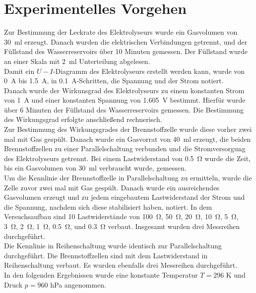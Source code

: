 \documentclass[a4paper,usenatbib]{aspdoc}
\begin{document}
       
    
    \section{Experimentelles Vorgehen}\label{sec:experiment}
        Zur Bestimmung der Leckrate des Elektrolyseurs wurde ein Gasvolumen von \SI{30}{\milli\litre} erzeugt. Danach wurden die elektrischen Verbindungen getrennt, und der Füllstand des Wasserreservoirs über 10 Minuten gemessen. Der Füllstand wurde an einer Skala mit \SI{2}{\milli\litre} Unterteilung abgelesen.\\
        Damit ein $U-I$-Diagramm des Elektrolyseurs erstellt werden kann, wurde von \SI{0}{\ampere} bis \SI{1,5}{\ampere}, in \SI{0,1}{\ampere}-Schritten, die Spannung und der Strom notiert.\\
        Danach wurde der Wirkunsgrad des Elektrolyseurs zu einem konstanten Strom von \SI{1}{\ampere} und einer konstanten Spannung von \SI{1,605}{\volt} bestimmt. Hierfür wurde über 6 Minuten der Füllstand des Wasserreservoirs gemessen. Die Bestimmung des Wirkungsgrad erfolgte anschließend rechnerisch.\\
        Zur Bestimmung des Wirkungsgrades der Brennstoffzelle wurde diese vorher zwei mal mit Gas gespült. Danach wurde ein Gasvorrat von \SI{40}{\milli\litre} erzeugt, die beiden Brennstoffzellen zu einer Parallelschaltung verbunden und die Stromversorgung des Elektrolyseurs getrennt. Bei einem Lastwiderstand von \SI{0,5}{\ohm}  wurde die Zeit, bis ein Gasvolumen von \SI{30}{\milli\litre} verbraucht wurde, gemessen.\\
        Um die Kennlinie der Brennstoffzelle in Parallelschaltung zu ermitteln, wurde die Zelle zuvor zwei mal mit Gas gespült. Danach wurde ein ausreichendes Gasvolumen erzeugt und zu jedem eingebautem Lastwiderstand der Strom und die Spannung, nachdem sich diese stabilisiert haben, notiert. In dem Versuchsaufbau sind 10 Lastwiderstände von \SI{100}{\ohm}, \SI{50}{\ohm}, \SI{20}{\ohm}, \SI{10}{\ohm}, \SI{5}{\ohm}, \SI{3}{\ohm}, \SI{2}{\ohm}, \SI{1}{\ohm}, \SI{0,5}{\ohm}, und \SI{0,3}{\ohm} verbaut. Insgesamt wurden drei Messreihen durchgeführt.\\
        Die Kennlinie in Reihenschaltung wurde identisch zur Parallelschaltung durchgeführt. Die Brennstoffzellen sind mit dem Lastwiderstand in Reihenschaltung verbaut. Es wurden ebenfalls drei Messreihen durchgeführt.
        \\
        In den folgenden Ergebnissen wurde eine konstante Temperatur $T = 296$ K und Druck $p = 960$ hPa angenommen.
\end{document}

